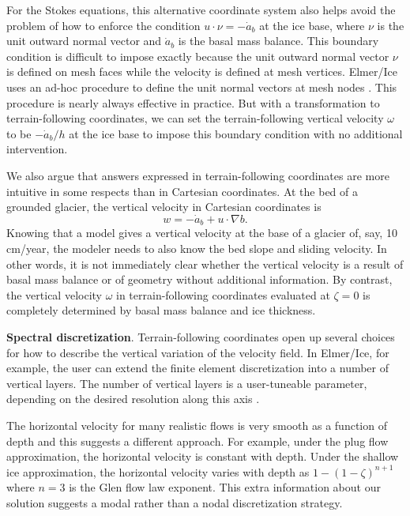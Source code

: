 \documentclass[journal abbreviation, manuscript]{copernicus}
\begin{document}
For the Stokes equations, this alternative coordinate system also helps avoid the problem of how to enforce the condition $u\cdot \nu = -\dot a_b$ at the ice base, where $\nu$ is the unit outward normal vector and $\dot a_b$ is the basal mass balance.
This boundary condition is difficult to impose exactly because the unit outward normal vector $\nu$ is defined on mesh faces while the velocity is defined at mesh vertices.
Elmer/Ice uses an ad-hoc procedure to define the unit normal vectors at mesh nodes \citep{gagliardini2013capabilities}.
This procedure is nearly always effective in practice.
But with a transformation to terrain-following coordinates, we can set the terrain-following vertical velocity $\omega$ to be $-\dot a_b/h$ at the ice base to impose this boundary condition with no additional intervention.

We also argue that answers expressed in terrain-following coordinates are more intuitive in some respects than in Cartesian coordinates.
At the bed of a grounded glacier, the vertical velocity in Cartesian coordinates is
\begin{equation}
    w = -\dot a_b + u\cdot\nabla b.
\end{equation}
Knowing that a model gives a vertical velocity at the base of a glacier of, say, 10 cm/year, the modeler needs to also know the bed slope and sliding velocity.
In other words, it is not immediately clear whether the vertical velocity is a result of basal mass balance or of geometry without additional information.
By contrast, the vertical velocity $\omega$ in terrain-following coordinates evaluated at $\zeta = 0$ is completely determined by basal mass balance and ice thickness.


\textbf{Spectral discretization}.
Terrain-following coordinates open up several choices for how to describe the vertical variation of the velocity field.
In Elmer/Ice, for example, the user can extend the finite element discretization into a number of vertical layers.
The number of vertical layers is a user-tuneable parameter, depending on the desired resolution along this axis \citep{gagliardini2013capabilities}.

The horizontal velocity for many realistic flows is very smooth as a function of depth and this suggests a different approach.
For example, under the plug flow approximation, the horizontal velocity is constant with depth.
Under the shallow ice approximation, the horizontal velocity varies with depth as $1 - (1 - \zeta)^{n + 1}$ where $n = 3$ is the Glen flow law exponent.
This extra information about our solution suggests a modal rather than a nodal discretization strategy.
\end{document}
